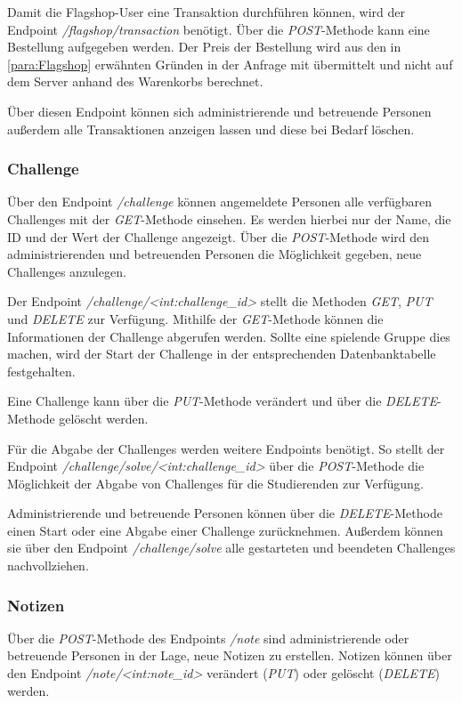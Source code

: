 Damit die Flagshop-User eine Transaktion durchführen können, wird der Endpoint \linebreak\textit{/flagshop/transaction} benötigt. Über die \textit{POST}-Methode kann eine Bestellung aufgegeben werden. Der Preis der Bestellung wird aus den in \autoref{para:Flagshop} erwähnten Gründen in der Anfrage mit übermittelt und nicht auf dem Server anhand des Warenkorbs berechnet.

Über diesen Endpoint können sich administrierende und betreuende Personen außerdem alle Transaktionen anzeigen lassen und diese bei Bedarf löschen.

\subsubsection{Challenge}
Über den Endpoint \textit{/challenge} können angemeldete Personen alle verfügbaren Challenges mit der \textit{GET}-Methode einsehen. Es werden hierbei nur der Name, die ID und der Wert der Challenge angezeigt. Über die \textit{POST}-Methode wird den administrierenden und betreuenden Personen die Möglichkeit gegeben, neue Challenges anzulegen.

Der Endpoint \textit{/challenge/<int:challenge\_id>} stellt die Methoden \textit{GET}, \textit{PUT} und \textit{DELETE} zur Verfügung. Mithilfe der \textit{GET}-Methode können die Informationen der Challenge abgerufen werden. Sollte eine spielende Gruppe dies machen, wird der Start der Challenge in der entsprechenden Datenbanktabelle festgehalten.

Eine Challenge kann über die \textit{PUT}-Methode verändert und über die \textit{DELETE}-Methode gelöscht werden.

Für die Abgabe der Challenges werden weitere Endpoints benötigt. So stellt der Endpoint \textit{/challenge/solve/<int:challenge\_id>} über die \textit{POST}-Methode die Möglichkeit der Abgabe von Challenges für die Studierenden zur Verfügung.

Administrierende und betreuende Personen können über die \textit{DELETE}-Methode einen Start oder eine Abgabe einer Challenge zurücknehmen. Außerdem können sie über den Endpoint \textit{/challenge/solve} alle gestarteten und beendeten Challenges nachvollziehen.

\subsubsection{Notizen}
Über die \textit{POST}-Methode des Endpoints \textit{/note} sind administrierende oder betreuende Personen in der Lage, neue Notizen zu erstellen. Notizen können über den Endpoint \textit{/note/<int:note\_id>} verändert (\textit{PUT}) oder gelöscht (\textit{DELETE}) werden.

